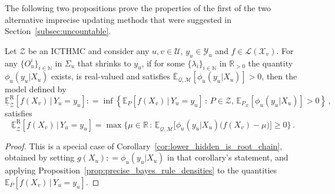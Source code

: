 \documentclass[twoside,11pt]{article}
\newcommand{\nats}{\mathbb{N}}
\newcommand{\reals}{\mathbb{R}}
\newcommand{\realspos}{\reals_{>0}}
\newcommand{\states}{\mathcal{X}}
\newcommand{\observs}{\mathcal{Y}}
\newcommand{\lexp}{\underline{\mathbb{E}}_{\rateset,\mathcal{M}}}
\newcommand{\uexp}{\overline{\mathbb{E}}_{\rateset,\mathcal{M}}}
\newcommand{\gambles}{\mathcal{L}}
\newcommand{\rateset}{\mathcal{Q}}
\newcommand{\coloneqq}{:\!=}
\begin{document}
The following two propositions prove the properties of the first of the two alternative imprecise updating methods that were suggested in Section~\ref{subsec:uncountable}.
\begin{proposition}\label{prop:regular_is_computable}
Let $\mathcal{Z}$ be an ICTHMC and consider any $u,v\in\mathcal{U}$, $y_u\in\observs_u$ and $f\in\gambles(\states_v)$. For any $\{O_u^i\}_{i\in\nats}$ in $\Sigma_u$ that shrinks to $y_u$, if for some $\{\lambda_i\}_{i\in\nats}$ in $\realspos$ the quantity $\phi_u(y_u\vert X_u)$ exists, is real-valued and satisfies $\uexp[\phi_u(y_u\vert X_u)]>0$, then the model defined by
\begin{equation*}
\underline{\mathbb{E}}_\mathcal{Z}^\mathrm{R}[f(X_v)\,\vert\,Y_u=y_u] \coloneqq \inf\left\{\mathbb{E}_P[f(X_v)\,\vert\,Y_u=y_u]\,:\,P\in\mathcal{Z},\,\mathbb{E}_{P_\states}[\phi_u(y_u\vert X_u)]>0\right\}\,,
\end{equation*}
satisfies
\begin{equation*}
\underline{\mathbb{E}}_\mathcal{Z}^\mathrm{R}[f(X_v)\,\vert\,Y_u=y_u] = \max\{\mu\in\reals\,:\,\lexp\bigl[\phi_u(y_u\vert X_u)\bigl(f(X_v)-\mu\bigr)\bigr] \geq 0\}\,.
\end{equation*}
\end{proposition}
\begin{proof}
This is a special case of Corollary~\ref{cor:lower_hidden_is_root_chain}, obtained by setting $g(X_u)\coloneqq \phi_u(y_u\vert X_u)$ in that corollary's statement, and applying Proposition~\ref{prop:precise_bayes_rule_densities} to the quantities $\mathbb{E}_P[f(X_v)\,\vert\,Y_u=y_u]$.
\end{proof}
\end{document}
